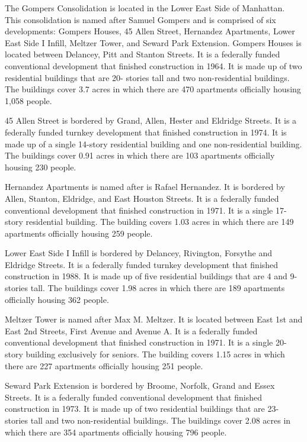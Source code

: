      

   

The Gompers Consolidation is located in the Lower East Side of Manhattan. This consolidation is named after Samuel Gompers and is comprised of six developments: Gompers Houses, 45 Allen Street, Hernandez Apartments, Lower East Side I Infill, Meltzer Tower, and Seward Park Extension. Gompers Houses is located between Delancey, Pitt and Stanton Streets. It is a federally funded conventional development that finished construction in 1964. It is made up of two residential buildings that are 20- stories tall and two non-residential buildings. The buildings cover 3.7 acres in which there are 470 apartments officially housing 1,058 people. 

45 Allen Street is bordered by Grand, Allen, Hester and Eldridge Streets. It is a federally funded turnkey development that finished construction in 1974. It is made up of a single 14-story residential building and one non-residential building. The buildings cover 0.91 acres in which there are 103 apartments officially housing 230 people. 

Hernandez Apartments is named after is Rafael Hernandez. It is bordered by Allen, Stanton, Eldridge, and East Houston Streets. It is a federally funded conventional development that finished construction in 1971. It is a single 17- story residential building. The building covers 1.03 acres in which there are 149 apartments officially housing 259 people. 

Lower East Side I Infill is bordered by Delancey, Rivington, Forsythe and Eldridge Streets. It is a federally funded turnkey development that finished construction in 1988. It is made up of five residential buildings that are 4 and 9- stories tall. The buildings cover 1.98 acres in which there are 189 apartments officially housing 362 people. 

Meltzer Tower is named after Max M. Meltzer. It is located between East 1st and East 2nd Streets, First Avenue and Avenue A. It is a federally funded conventional development that finished construction in 1971. It is a single 20-story building exclusively for seniors. The building covers 1.15 acres in which there are 227 apartments officially housing 251 people. 

Seward Park Extension is bordered by Broome, Norfolk, Grand and Essex Streets. It is a federally funded conventional development that finished construction in 1973. It is made up of two residential buildings that are 23- stories tall and two non-residential buildings. The buildings cover 2.08 acres in which there are 354 apartments officially housing 796 people. 